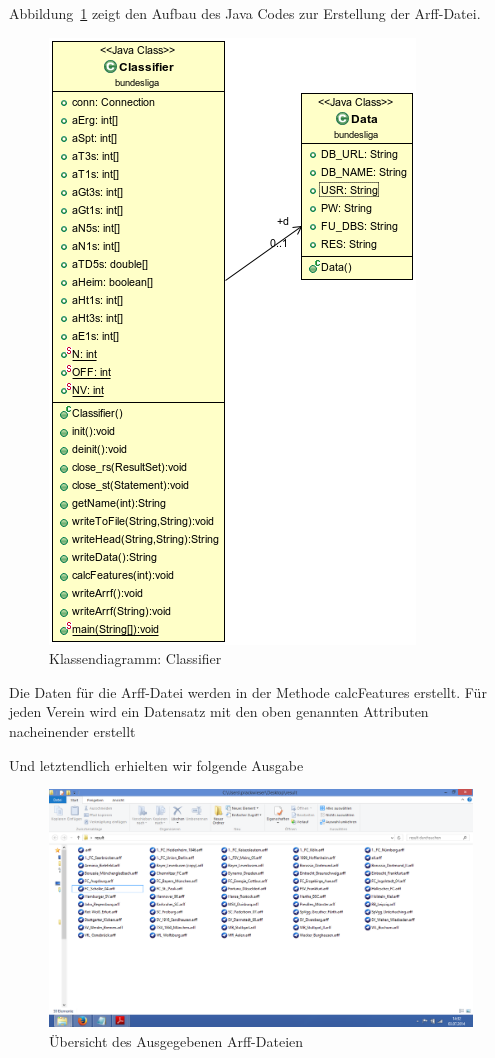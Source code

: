\documentclass[
10pt,
a4paper
]{scrartcl}
\begin{document}
Abbildung~\ref{fig5} zeigt den Aufbau des Java Codes zur Erstellung der Arff-Datei.
\begin{figure}[ht]
\centering
  \includegraphics[scale=0.7]{Classifier.png}
\caption{Klassendiagramm: Classifier}
\label{fig5}
\end{figure}

Die Daten für die Arff-Datei werden in der Methode calcFeatures erstellt.
Für jeden Verein wird ein Datensatz mit den oben genannten Attributen nacheinender erstellt


Und letztendlich erhielten wir folgende Ausgabe

\begin{figure}[ht1]
\centering
  \includegraphics[scale=0.3]{Ausgabe.png}
\caption{Übersicht des Ausgegebenen Arff-Dateien}
\label{fig6}
\end{figure}
\end{document}
